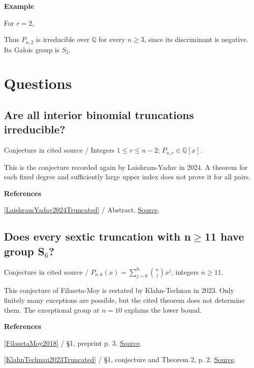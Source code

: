 \documentclass[11pt,a4paper,oneside,openany]{book}
\newcommand{\atlasdisplay}[1]{\par\begingroup\centering\vspace{3pt}\noindent\adjustbox{max width=\linewidth}{\(\displaystyle #1\)}\par\vspace{5pt}\endgroup}
\newenvironment{sources}{\par\smallskip\begingroup\footnotesize\color{atlasgray}\leftskip=10pt\setlength{\parskip}{2pt}}{\par\endgroup\smallskip}
\begin{document}
\begin{atlasblock}[standard]
\textbf{\sffamily Example}\par\smallskip
\color{black} For \(r=2\),\par

\atlasdisplay{\operatorname{disc}(P_{n,2})=n^2-4\binom n2=n(2-n).}
\color{black} Thus \(P_{n,2}\) is irreducible over \(\mathbb Q\) for every \(n\ge3\), since its discriminant is negative. Its Galois group is \(S_2\).\par
\end{atlasblock}\color{black}
\section*{Questions}
\subsection*{Are all interior binomial truncations irreducible?}
{\small\sffamily\color{atlasgold}Conjecture in cited source / Integers \(1\le r\le n-2\); \(P_{n,r}\in\mathbb Q[x]\).}\par\smallskip
\color{black} This is the conjecture recorded again by Laishram-Yadav in 2024. A theorem for each fixed degree and sufficiently large upper index does not prove it for all pairs.\par
\begin{sources}
\textbf{References}\par\smallskip
\noindent\hyperlink{ref:LaishramYadav2024Truncated}{[LaishramYadav2024Truncated]} / Abstract.  \href{https://doi.org/10.1142/S1793042124500817}{Source}.\par
\end{sources}\color{black}
\subsection*{Does every sextic truncation with n\ensuremath{\ge}11 have group S\ensuremath{{}_6}?}
{\small\sffamily\color{atlasgold}Conjecture in cited source / \(P_{n,6}(x)=\sum_{j=0}^6\binom njx^j\), integers \(n\ge11\).}\par\smallskip
\color{black} This conjecture of Filaseta-Moy is restated by Klahn-Technau in 2023. Only finitely many exceptions are possible, but the cited theorem does not determine them. The exceptional group at \(n=10\) explains the lower bound.\par
\begin{sources}
\textbf{References}\par\smallskip
\noindent\hyperlink{ref:FilasetaMoy2018}{[FilasetaMoy2018]} / §1, preprint p. 3.  \href{https://doi.org/10.4064/cm7474-3-2018}{Source}.\par
\noindent\hyperlink{ref:KlahnTechnau2023Truncated}{[KlahnTechnau2023Truncated]} / §1, conjecture and Theorem 2, p. 2.  \href{https://doi.org/10.1142/S1793042123501208}{Source}.\par
\end{sources}\color{black}
\end{document}
